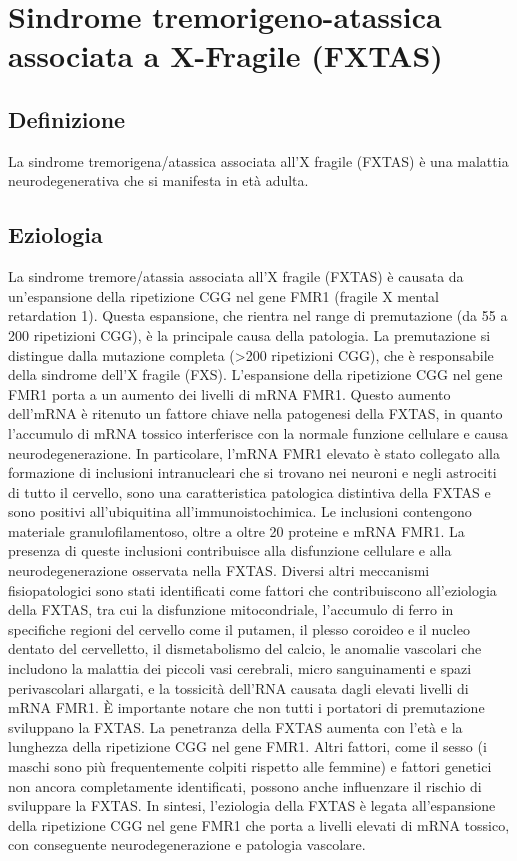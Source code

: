\section {Sindrome tremorigeno-atassica associata a X-Fragile (FXTAS)}

\subsection{Definizione}
La sindrome tremorigena/atassica associata all'X fragile (FXTAS) è una malattia neurodegenerativa che si manifesta in età adulta.

\subsection{Eziologia}
La sindrome tremore/atassia associata all'X fragile (FXTAS) è causata da un'espansione della ripetizione CGG nel gene FMR1 (fragile X mental retardation 1). Questa espansione, che rientra nel range di premutazione (da 55 a 200 ripetizioni CGG), è la principale causa della patologia. La premutazione si distingue dalla mutazione completa (>200 ripetizioni CGG), che è responsabile della sindrome dell'X fragile (FXS).
L'espansione della ripetizione CGG nel gene FMR1 porta a un aumento dei livelli di mRNA FMR1. Questo aumento dell'mRNA è ritenuto un fattore chiave nella patogenesi della FXTAS, in quanto l'accumulo di mRNA tossico interferisce con la normale funzione cellulare e causa neurodegenerazione. In particolare, l'mRNA FMR1 elevato è stato collegato alla formazione di inclusioni intranucleari che si trovano nei neuroni e negli astrociti di tutto il cervello, sono una caratteristica patologica distintiva della FXTAS e sono positivi all'ubiquitina all'immunoistochimica. Le inclusioni contengono materiale granulofilamentoso, oltre a oltre 20 proteine e mRNA FMR1. La presenza di queste inclusioni contribuisce alla disfunzione cellulare e alla neurodegenerazione osservata nella FXTAS.
Diversi altri meccanismi fisiopatologici sono stati identificati come fattori che contribuiscono all'eziologia della FXTAS, tra cui la disfunzione mitocondriale, l'accumulo di ferro in specifiche regioni del cervello come il putamen, il plesso coroideo e il nucleo dentato del cervelletto, il dismetabolismo del calcio, le anomalie vascolari che includono la malattia dei piccoli vasi cerebrali, micro sanguinamenti e spazi perivascolari allargati, e la tossicità dell'RNA causata dagli elevati livelli di mRNA FMR1.
È importante notare che non tutti i portatori di premutazione sviluppano la FXTAS. La penetranza della FXTAS aumenta con l'età e la lunghezza della ripetizione CGG nel gene FMR1. Altri fattori, come il sesso (i maschi sono più frequentemente colpiti rispetto alle femmine) e fattori genetici non ancora completamente identificati, possono anche influenzare il rischio di sviluppare la FXTAS. In sintesi, l'eziologia della FXTAS è legata all'espansione della ripetizione CGG nel gene FMR1 che porta a livelli elevati di mRNA tossico, con conseguente neurodegenerazione e patologia vascolare.

